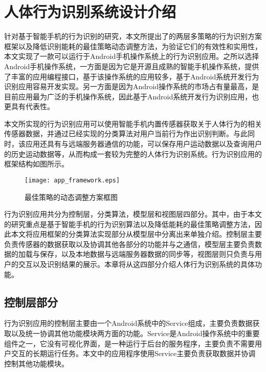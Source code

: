 \chapter{人体行为识别系统设计介绍}
\par 针对基于智能手机的行为识别的研究，本文所提出了的两层多策略的行为识别方案框架以及降低识别能耗的最佳策略动态调整方法，为验证它们的有效性和实用性，本文实现了一款可以运行于Android手机操作系统上的行为识别应用。之所以选择Android手机操作系统，一方面是因为它是开源且成熟的智能手机操作系统，提供了丰富的应用编程接口，基于该操作系统的应用较多，基于Android系统开发行为识别应用容易开发实现。另一方面是因为Android操作系统的市场占有量最高，是目前应用最为广泛的手机操作系统，因此基于Android系统开发行为识别应用，也更具有代表性。
\par 本文所实现的行为识别应用可以使用智能手机内置传感器获取关于人体行为的相关传感器数据，并通过已经实现的分类算法对用户当前行为作出识别判断。与此同时，该应用还具有与远端服务器通信的功能，可以保存用户运动数据以及查询用户的历史运动数据等，从而构成一套较为完整的人体行为识别系统。行为识别应用的框架结构如图所示。
\begin{figure}[ht]
\centering
\texttt{[image: app\_framework.eps]}
\caption{最佳策略的动态调整方案框图}
\end{figure}
\par 行为识别应用共分为控制层，分类算法，模型层和视图层四部分。其中，由于本文的研究重点是基于智能手机的行为识别算法以及降低能耗的最佳策略调整方法，因此本文将应用框架的分类算法实现部分从模型层中分离出来单独介绍。控制层主要负责传感器的数据获取以及协调其他各部分的功能并与之通信，模型层主要负责数据的加载与保存，以及本地数据与远端服务器数据的同步等，视图层则只负责与用户的交互以及识别结果的展示。本章将从这四部分介绍人体行为识别系统的具体功能。
\section{控制层部分}
\par 行为识别应用的控制层主要由一个Android系统中的Service组成，主要负责数据获取以及统一协调其他功能模块两方面的功能。Service是Android操作系统中的重要组件之一，它没有可视化界面，是一种运行于后台的服务程序，主要负责不需要用户交互的长期运行任务。本文中的应用程序使用Service主要负责获取数据并协调控制其他功能模块。

